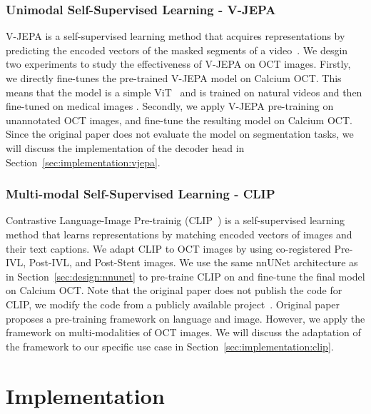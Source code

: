 \documentclass[a4paper,11pt,oneside]{report}
\begin{document}

\subsection{Unimodal Self-Supervised Learning - V-JEPA}
V-JEPA is a self-supervised learning method that acquires representations by predicting the encoded vectors of the masked segments of a video~\cite{Bardes2024Vjepa}. We desgin two experiments to study the effectiveness of V-JEPA on OCT images. Firstly, we directly fine-tunes the pre-trained V-JEPA model on Calcium OCT. This means that the model is a simple ViT~\cite{Dosovitskiy2020vit} and is trained on natural videos and then fine-tuned on medical images . Secondly, we apply V-JEPA pre-training on unannotated OCT images, and fine-tune the resulting model on Calcium OCT. Since the original paper does not evaluate the model on segmentation tasks, we will discuss the implementation of the decoder head in Section~\ref{sec:implementation:vjepa}.


\subsection{Multi-modal Self-Supervised Learning - CLIP}
Contrastive Language-Image Pre-trainig (CLIP~\cite{Radford2021CLIP}) is a self-supervised learning method that learns representations by matching encoded vectors of images and their text captions. We adapt CLIP to OCT images by using co-registered Pre-IVL, Post-IVL, and Post-Stent images. We use the same nnUNet architecture as in Section~\ref{sec:design:nnunet} to pre-traine CLIP on and fine-tune the final model on Calcium OCT. Note that the original paper does not publish the code for CLIP, we modify the code from a publicly available project~\cite{Shariatnia2021}. Original paper proposes a pre-training framework on language and image. However, we apply the framework on multi-modalities of OCT images. We will discuss the adaptation of the framework to our specific use case in Section~\ref{sec:implementation:clip}.

\chapter{Implementation}

\end{document}
